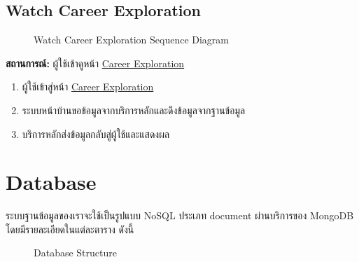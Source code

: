 \subsection{Watch Career Exploration}
\begin{figure}[H]\centering
    \setlength{\fboxrule}{0.2mm} %
    \caption{Watch Career Exploration Sequence Diagram}\label{fig:exploreSeqDiagram}
\end{figure}
\textbf{สถานการณ์: }ผู้ใช้เข้าดูหน้า \hyperref[subsec:Career Exploration]{Career Exploration}
\begin{enumerate}
    \item ผู้ใช้เข้าสู่หน้า \hyperref[subsec:Career Exploration]{Career Exploration}
    \item ระบบหน้าบ้านขอข้อมูลจากบริการหลักและดึงข้อมูลจากฐานข้อมูล
    \item บริการหลักส่งข้อมูลกลับสู่ผู้ใช้และแสดงผล
\end{enumerate}



\section{Database}
ระบบฐานข้อมูลของเราจะใช้เป็นรูปแบบ NoSQL ประเภท document ผ่านบริการของ MongoDB โดยมีรายละเอียดในแต่ละตาราง ดังนี้
\begin{figure}[H]\centering
    \setlength{\fboxrule}{0.2mm} %
    \setlength{\fboxsep}{0.5cm}
    \caption{Database Structure}\label{fig:database}
\end{figure}

